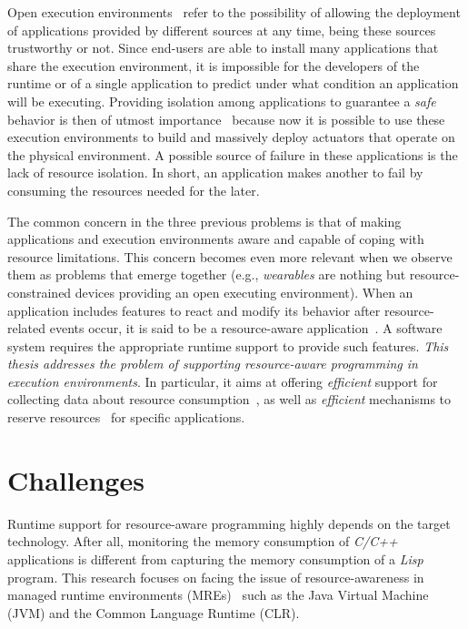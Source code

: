 Open execution environments~\cite{} refer to the possibility of allowing the deployment of applications provided by different sources at any time, being these sources trustworthy or not.
Since end-users are able to install many applications that share the execution environment, it is impossible for the developers of the runtime or of a single application to predict under what condition an application will be executing.
Providing isolation among applications to guarantee a \textit{safe} behavior is then of utmost importance~\cite{} because now it is possible to use these execution environments to build and massively deploy actuators that operate on the physical environment.
A possible source of failure in these applications is the lack of resource isolation.
In short, an application makes another to fail by consuming the resources needed for the later.

The common concern in the three previous problems is that of making applications and execution environments aware and capable of coping with resource limitations.
This concern becomes even more relevant when
we observe them as problems that emerge together
(e.g., \textit{wearables} are nothing but resource-constrained devices providing an open executing environment).
When an application includes features to react and modify its behavior after resource-related events occur, it is said to be a resource-aware application~\cite{}.
A software system requires the appropriate runtime support to provide such features.   
\textit{This thesis addresses the problem of supporting resource-aware programming in execution environments}.
In particular, it aims at offering \textit{efficient} support for collecting data about resource consumption~\cite{}, as well as \textit{efficient} mechanisms to reserve resources~\cite{} for specific applications.

\section{Challenges}

Runtime support for resource-aware programming highly depends on the target technology.
After all, monitoring the memory consumption of \textit{C/C++} applications is different from capturing the memory consumption of a \textit{Lisp} program.
This research focuses on facing the issue of resource-awareness in managed runtime environments (MREs)~\cite{} such as the Java Virtual Machine (JVM) and the Common Language Runtime (CLR).

